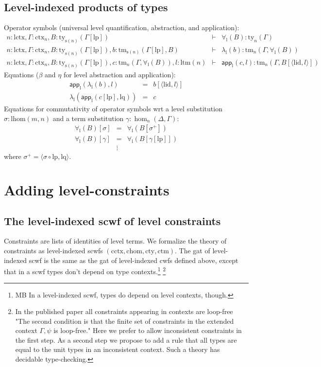 \documentclass[11pt,a4paper]{article}
\theoremstyle{definition}
\newcommand{\app}[2]{{#1\,#2}} %
\def\lhom{\mathrm{lhom}}
\def\lctx{\mathrm{lctx}}
\def\ltm{\mathrm{ltm}}
\def\lp{\mathrm{lp}}
\def\lq{\mathrm{lq}}
\def\s{\mathrm{s}}
\def\lid{\mathrm{lid}}
\def\cctx{\mathrm{cctx}}
\def\cty{\mathrm{cty}}
\def\ctm{\mathrm{ctm}}
\def\chom{\mathrm{chom}}
\newcommand{\ctx}{\mathrm{ctx}}
\newcommand{\ty}{\mathrm{ty}}
\newcommand{\tm}{\mathrm{tm}}
\newcommand{\tuple}[1]{\langle #1 \rangle}
\def\p{\mathrm{p}}
\def\q{\mathrm{q}}
\def\app{\mathsf{app}}
\begin{document}
\subsection{Level-indexed products of types}
\def\l{\mathrm{l}}
Operator symbols (universal level quantification, abstraction, and application):
\begin{eqnarray*}
n : \lctx, \Gamma : \ctx_n, B : \ty_{\s(n)}(\Gamma[\lp])&\vdash& \forall_\l(B) : \ty_n(\Gamma)\\
n : \lctx, \Gamma : \ctx_n, B : \ty_{\s(n)}(\Gamma[\lp]), b : \tm_{\s(n)}(\Gamma[\lp], B) &\vdash& \lambda_\l(b) : \tm_n(\Gamma,\forall_\l(B))\\
n : \lctx, \Gamma : \ctx_n, B : \ty_{\s(n)}(\Gamma[\lp]), c :  \tm_n(\Gamma,\forall_\l(B)), l : \ltm(n) &\vdash& \app_\l(c,l) : \tm_n(\Gamma, B[\tuple{\lid,l}])
\end{eqnarray*}
Equations ($\beta$ and $\eta$ for level abstraction and application):
 \begin{eqnarray*}
 \app_\l(\lambda_\l(b),l) &=& b[\tuple{\lid,l}]\\
 \lambda_\l(\app_\l(c[\lp],\lq)) &=& c
 \end{eqnarray*}
 Equations for commutativity of operator symbols wrt a level substitution $\sigma : \lhom(m,n)$ and a term substitution $\gamma : \hom_n(\Delta,\Gamma)$:
 \begin{eqnarray*}
 \forall_\l(B)[ \sigma ] &=& \forall_\l(B[ \sigma^{+}])\\
 \forall_\l(B)[ \gamma ] &=& \forall_\l(B[ \gamma[\lp]])\\
&\vdots&
\end{eqnarray*}
where $\sigma^+ = \tuple{\sigma \circ \lp, \lq}$.

\section{Adding level-constraints}

\subsection{The level-indexed scwf of level constraints}

Constraints are lists of identities of level terms. We formalize the theory of constraints as level-indexed scwfs $(\cctx, \chom, \cty, \ctm)$. The gat of level-indexed scwf is the same as the gat of level-indexed cwfs defined above, except that in a scwf types don't depend on type contexts.\footnote{MB In a level-indexed scwf, types do depend on level contexts, though.} \footnote{In the published paper all constraints appearing in contexts are loop-free "The second condition is that the finite set of constraints in the extended context $\Gamma, \psi$ is loop-free." Here we prefer to allow inconsistent constraints in the first step. As a second step we propose to add a rule that all types are equal to the unit types in an inconsistent context. Such a theory has decidable type-checking.}
\end{document}
